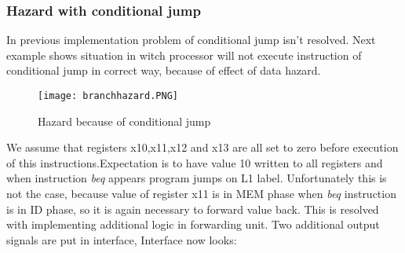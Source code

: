 \documentclass{scrreprt}
\begin{document}
        \subsubsection*{Hazard with conditional jump}
        In previous implementation problem of conditional jump isn't resolved. Next example shows situation in witch processor will not execute instruction of conditional jump in correct way, because of effect of data hazard. 
        \begin{figure}[htb!]
            \centering
            \texttt{[image: branchhazard.PNG]}
            \caption{Hazard because of conditional jump}
            \label{fig:conditional jump}
        \end{figure}
        We assume that registers x10,x11,x12 and x13 are all set to zero before execution of this instructions.Expectation is to have value 10 written to all registers and when instruction \textit{beq} appears program jumps on L1 label. Unfortunately this is not the case, because value of register x11 is in MEM phase when \textit{beq} instruction is in ID phase, so it is again necessary to forward value back. This is resolved with implementing additional logic in forwarding unit. Two additional output signals are put in interface, Interface now looks:
\end{document}
